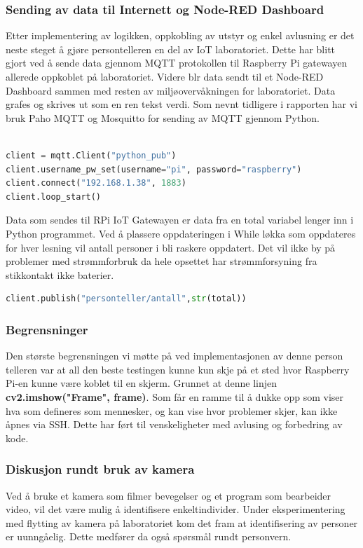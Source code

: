 \documentclass{article}
\begin{document}
\subsubsection{Sending av data til Internett og Node-RED Dashboard}
Etter implementering av logikken, oppkobling av utstyr og enkel avlusning er det neste steget å gjøre persontelleren en del av IoT laboratoriet. Dette har blitt gjort ved å sende data gjennom MQTT protokollen til  Raspberry Pi gatewayen allerede oppkoblet på laboratoriet. Videre blr data sendt til et Node-RED Dashboard sammen med resten av miljøovervåkningen for laboratoriet. Data grafes og skrives ut som en ren tekst verdi.  Som nevnt tidligere i rapporten har vi bruk Paho MQTT og Mosquitto for sending av MQTT gjennom Python. 

\begin{lstlisting}[language=Python, caption=Paho MQTT tilkobling av klient]

client = mqtt.Client("python_pub")
client.username_pw_set(username="pi", password="raspberry")
client.connect("192.168.1.38", 1883) 
client.loop_start()
\end{lstlisting}

Data som sendes til RPi IoT Gatewayen er data fra en total variabel lenger inn i Python programmet. Ved å plassere oppdateringen i While løkka som oppdateres for hver lesning vil antall personer i bli raskere oppdatert. Det vil ikke by på problemer med strømmforbruk da hele opsettet har strømmforsyning fra stikkontakt ikke baterier.
\begin{lstlisting}[language=Python, caption=Publisering av antall personer til IoT Gateway via Paho MQTT i Python]
client.publish("personteller/antall",str(total))
\end{lstlisting}

\subsubsection{Begrensninger}

Den største begrensningen vi møtte på ved implementasjonen av denne person telleren var at all den beste testingen kunne kun skje på et sted hvor Raspberry Pi-en kunne være koblet til en skjerm. Grunnet at denne linjen \textbf{cv2.imshow("Frame", frame)}. Som får en ramme til å dukke opp som viser hva som defineres som mennesker, og kan vise hvor problemer skjer, kan ikke åpnes via SSH. Dette har ført til venskeligheter med avlusing og forbedring av kode.

\subsubsection{Diskusjon rundt bruk av kamera}
Ved å bruke et kamera som filmer bevegelser og et program som bearbeider video, vil det være mulig å identifisere enkeltindivider. Under eksperimentering med flytting av kamera på laboratoriet kom det fram at identifisering av personer er uunngåelig. Dette medfører da også spørsmål rundt personvern. 
\end{document}
